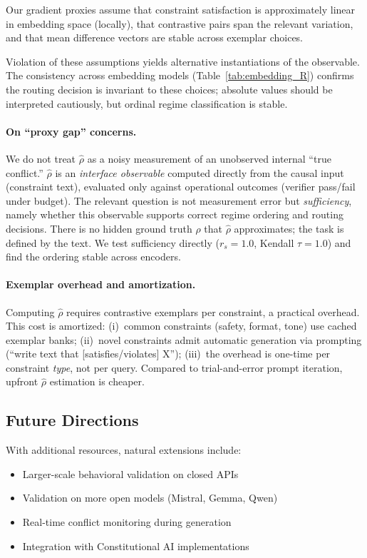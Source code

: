 \documentclass{article}
\theoremstyle{plain}
\theoremstyle{definition}
\theoremstyle{remark}
\newcommand{\rhohat}{\hat{\rho}}
\begin{document}
Our gradient proxies assume that constraint satisfaction is approximately linear in embedding space (locally), that contrastive pairs span the relevant variation, and that mean difference vectors are stable across exemplar choices.

Violation of these assumptions yields alternative instantiations of the observable. The consistency across embedding models (Table~\ref{tab:embedding_R}) confirms the routing decision is invariant to these choices; absolute values should be interpreted cautiously, but ordinal regime classification is stable.

\paragraph{On ``proxy gap'' concerns.}
We do not treat $\hat\rho$ as a noisy measurement of an unobserved internal ``true conflict.'' $\hat\rho$ is an \emph{interface observable} computed directly from the causal input (constraint text), evaluated only against operational outcomes (verifier pass/fail under budget). The relevant question is not measurement error but \emph{sufficiency}, namely whether this observable supports correct regime ordering and routing decisions. There is no hidden ground truth $\rho$ that $\hat\rho$ approximates; the task is defined by the text. We test sufficiency directly ($r_s = 1.0$, Kendall $\tau = 1.0$) and find the ordering stable across encoders.

\paragraph{Exemplar overhead and amortization.}
Computing $\rhohat$ requires contrastive exemplars per constraint, a practical overhead. This cost is amortized: (i)~common constraints (safety, format, tone) use cached exemplar banks; (ii)~novel constraints admit automatic generation via prompting (``write text that [satisfies/violates] X''); (iii)~the overhead is one-time per constraint \emph{type}, not per query. Compared to trial-and-error prompt iteration, upfront $\rhohat$ estimation is cheaper.

\subsection{Future Directions}

With additional resources, natural extensions include:
\begin{itemize}
\item Larger-scale behavioral validation on closed APIs
\item Validation on more open models (Mistral, Gemma, Qwen)
\item Real-time conflict monitoring during generation
\item Integration with Constitutional AI implementations
\end{itemize}
\end{document}
